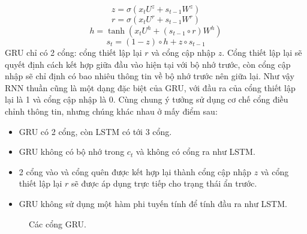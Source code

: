 \[ z = \sigma(x_t U^z + s_{t-1} W^z)  \]
\[r = \sigma(x_t U^r + s_{t-1} W^r)  \]
\[h = \tanh(x_t U^h + (s_{t-1} \circ r) W^h) \]
\[s_t = {(1 - z) \circ h} + {z \circ s_{t-1}} \]
​
GRU chỉ có 2 cổng: cổng thiết lập lại \(r\) và cổng cập nhập \(z\). Cổng thiết lập lại sẽ quyết định cách kết hợp giữa
đầu vào hiện tại với bộ nhớ trước, còn cổng cập nhập sẽ chỉ định có bao nhiêu thông tin về bộ nhớ trước nên giữa lại.
Như vậy RNN thuần cũng là một dạng đặc biệt của GRU, với đầu ra của cổng thiết lập lại là 1 và cổng cập nhập là 0.
Cùng chung ý tưởng sử dụng cơ chế cổng điều chỉnh thông tin, nhưng chúng khác nhau ở mấy điểm sau:
\begin{itemize}
    \item GRU có 2 cổng, còn LSTM có tới 3 cổng.
    \item GRU không có bộ nhớ trong \(c_t\) và không có cổng ra như LSTM.
    \item 2 cổng vào và cổng quên được kết hợp lại thành cổng cập nhập \(z\) và cổng thiết lập lại \(r\) sẽ được áp dụng trực tiếp cho trạng thái ẩn trước.
    \item GRU không sử dụng một hàm phi tuyến tính để tính đầu ra như LSTM.
\end{itemize}
\begin{figure}[!htb]
    \caption{\label{fig:GRU} Các cổng GRU.}
\end{figure}
